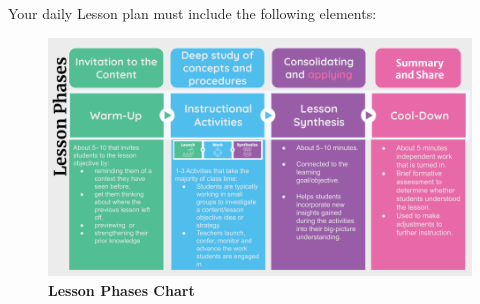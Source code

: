\documentclass[11pt, letterpaper]{article}
\begin{document}
Your daily Lesson plan must include the following elements:
\begin{itemize}

\begin{figure}[H]
  \centering
\includegraphics[width=1\linewidth]{lesson_instructional_phases.png}
\caption{\textbf{Lesson Phases Chart}}
  \label{fig:lesson-phases}
\end{figure}


\end{itemize}
\end{document}

